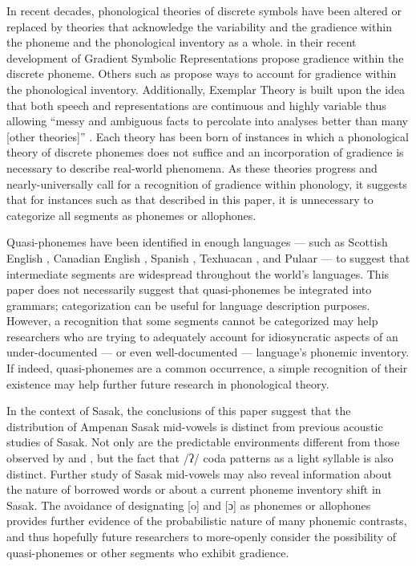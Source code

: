 \documentclass[12pt]{ouparticle}
\begin{document}
In recent decades, phonological theories of discrete symbols have been altered or replaced by theories that acknowledge the variability and the gradience within the phoneme and the phonological inventory as a whole. \citet{smolensky2016} in their recent development of Gradient Symbolic Representations propose gradience within the discrete phoneme. Others such as \citet{hall2009,hall2012,hall2013} propose ways to account for gradience within the phonological inventory. Additionally, Exemplar Theory is built upon the idea that both speech and representations are continuous and highly variable \citep{goldinger1998, johnson2005} thus allowing “messy and ambiguous facts to percolate into analyses better than many [other theories]” \citep[16]{scobbie2008}. Each theory has been born of instances in which a phonological theory of discrete phonemes does not suffice and an incorporation of gradience is necessary to describe real-world phenomena. As these theories progress and nearly-universally call for a recognition of gradience within phonology, it suggests that for instances such as that described in this paper, it is unnecessary to categorize all segments as phonemes or allophones. 

Quasi-phonemes have been identified in enough languages --- such as Scottish English \citep{scobbie2008}, Canadian English \citep[e.g.][]{myers1993}, Spanish \citep{hualde2005}, Texhuacan \citep{hill1998}, and Pulaar \citep{paradis1986} --- to suggest that intermediate segments are widespread throughout the world's languages. This paper does not necessarily suggest that quasi-phonemes be integrated into grammars; categorization can be useful for language description purposes. However, a recognition that some segments cannot be categorized may help researchers who are trying to adequately account for idiosyncratic aspects of an under-documented --- or even well-documented --- language's phonemic inventory. If indeed, quasi-phonemes are a common occurrence, a simple recognition of their existence may help further future research in phonological theory.

In the context of Sasak, the  conclusions of this paper suggest that the distribution of Ampenan Sasak mid-vowels is distinct from previous acoustic studies of Sasak. Not only are the predictable environments different from those observed by \citet{chahal1998} and \citet{archangeli2018}, but the fact that /ʔ/ coda patterns as a light syllable is also distinct. Further study of Sasak mid-vowels may also reveal information about the nature of borrowed words or about a current phoneme inventory shift in Sasak. The avoidance of designating [o] and [ɔ] as phonemes or allophones provides further evidence of the probabilistic nature of many phonemic contrasts, and thus hopefully future researchers to more-openly consider the possibility of quasi-phonemes or other segments who exhibit gradience.
\end{document}
